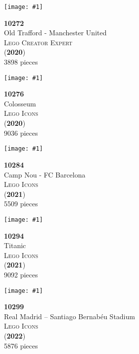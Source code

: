 \documentclass[letterpaper]{article}%
\newenvironment{legocell}[1]
{
	\begin{minipage}[c][2.0in][c]{4in}
	\centering
	\varwidth{3.6in}
	\raggedright %
	\begin{minipage}[c]{1.3in}
		\texttt{[image: \#1]}
	\end{minipage}
	\begin{minipage}[c]{2.2in}
	\raggedright
}
{
	\end{minipage}
	\endvarwidth
	\end{minipage}
	\allowbreak
	\ignorespaces
}
\begin{document}
\begin{legocell}{images/set_10272-1.jpg}
\textbf{10272}\\
{\sffamily\large Old Trafford - Manchester United}\\
\textsc{\color{DarkBlue}\normalsize Lego Creator Expert}\\
(\textbf{2020})\\
{\normalsize 3898 pieces}\\
\end{legocell}
\begin{legocell}{images/set_10276-1.jpg}
\textbf{10276}\\
{\sffamily\large Colosseum}\\
\textsc{\color{DarkBlue}\normalsize Lego Icons}\\
(\textbf{2020})\\
{\normalsize 9036 pieces}\\
\end{legocell}
\begin{legocell}{images/set_10284-1.jpg}
\textbf{10284}\\
{\sffamily\large Camp Nou - FC Barcelona}\\
\textsc{\color{DarkBlue}\normalsize Lego Icons}\\
(\textbf{2021})\\
{\normalsize 5509 pieces}\\
\end{legocell}
\begin{legocell}{images/set_10294-1.jpg}
\textbf{10294}\\
{\sffamily\large Titanic}\\
\textsc{\color{DarkBlue}\normalsize Lego Icons}\\
(\textbf{2021})\\
{\normalsize 9092 pieces}\\
\end{legocell}
\begin{legocell}{images/set_10299-1.jpg}
\textbf{10299}\\
{\sffamily\large Real Madrid – Santiago Bernabéu Stadium}\\
\textsc{\color{DarkBlue}\normalsize Lego Icons}\\
(\textbf{2022})\\
{\normalsize 5876 pieces}\\
\end{legocell}
\end{document}
